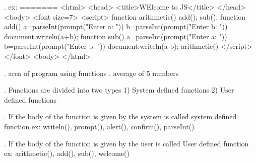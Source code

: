 . ex:
=======
<html>
  <head>
   <title>WElcome to JS</title>
  </head>
  <body>
    <font size=7>
     <script>
	 function arithmetic()
	 {
		  add();
		  sub();
	 }
	 function add()
	 {
		 a=parseInt(prompt("Enter a: "))
		 b=parseInt(prompt("Enter b: "))
		 document.writeln(a+b);
	 }
	function sub()
	 {
		 a=parseInt(prompt("Enter a: "))
		 b=parseInt(prompt("Enter b: "))
		 document.writeln(a-b);
	 }
	 arithmetic()
	</script>
   </font>
  <body>
</html>

. area of program using functions
. average of 5 numbers

. Functions are divided into two types
  1) System defined functions
  2) User defined functions

. If the body of the function is given by the system is called system defined function
  ex: writeln(), prompt(), alert(), confirm(), parseInt()

. If the body of the function is given by the user is called User defined function
  ex:  arithmetic(), add(), sub(), welcome()


 
